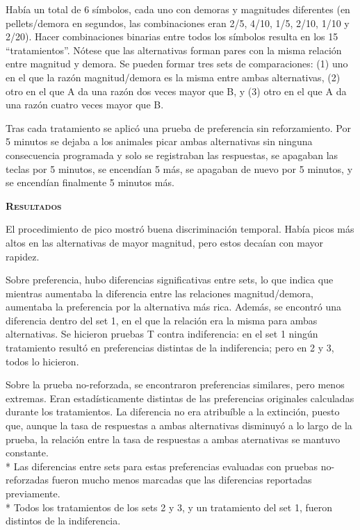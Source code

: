 \documentclass[a4paper,12pt]{article}
\begin{document}
Había un total de 6 símbolos, cada uno con demoras y magnitudes diferentes (en pellets/demora en segundos, las combinaciones eran 2/5, 4/10, 1/5, 2/10, 1/10 y 2/20). Hacer combinaciones binarias entre todos los símbolos resulta en los 15 ``tratamientos''. Nótese que las alternativas forman pares con la misma relación entre magnitud y demora. Se pueden formar tres sets de comparaciones: (1) uno en el que la razón magnitud/demora es la misma entre ambas alternativas, (2) otro en el que A da una razón dos veces mayor que B, y (3) otro en el que A da una razón cuatro veces mayor que B.

Tras cada tratamiento se aplicó una prueba de preferencia sin reforzamiento. Por 5 minutos se dejaba a los animales picar ambas alternativas sin ninguna consecuencia programada y solo se registraban las respuestas, se apagaban las teclas por 5 minutos, se encendían 5 más, se apagaban de nuevo por 5 minutos, y se encendían finalmente 5 minutos más.

{\scshape\bfseries Resultados}

El procedimiento de pico mostró buena discriminación temporal. Había picos más altos en las alternativas de mayor magnitud, pero estos decaían con mayor rapidez.

Sobre preferencia, hubo diferencias significativas entre sets, lo que indica que mientras aumentaba la diferencia entre las relaciones magnitud/demora, aumentaba la preferencia por la alternativa más rica. Además, se encontró una diferencia dentro del set 1, en el que la relación era la misma para ambas alternativas. Se hicieron pruebas T contra indiferencia: en el set 1 ningún tratamiento resultó en preferencias distintas de la indiferencia; pero en 2 y 3, todos lo hicieron.

Sobre la prueba no-reforzada, se encontraron preferencias similares, pero menos extremas. Eran estadísticamente distintas de las preferencias originales calculadas durante los tratamientos. La diferencia no era atribuíble a la extinción, puesto que, aunque la tasa de respuestas a ambas alternativas disminuyó a lo largo de la prueba, la relación entre la tasa de respuestas a ambas aternativas se mantuvo constante. \\*
Las diferencias entre sets para estas preferencias evaluadas con pruebas no-reforzadas fueron mucho menos marcadas que las diferencias reportadas previamente.\\*
Todos los tratamientos de los sets 2 y 3, y un tratamiento del set 1, fueron distintos de la indiferencia.
\end{document}
